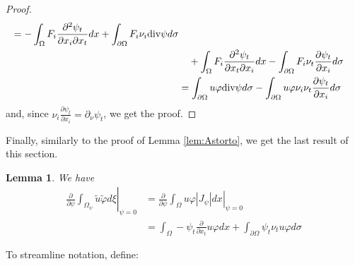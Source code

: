 \documentclass[a4paper,reqno,11pt,oneside]{amsart}
\theoremstyle{plain}
\theoremstyle{plain}
\newtheorem{lemma}[thm]{Lemma}
\theoremstyle{plain}
\theoremstyle{remark}
\newtheorem{remark}[thm]{Remark}
\def\div{\textup{div}}
\begin{document}
\begin{proof}
$$\begin{aligned}
        =
        -\int_\Omega F_i   \frac{\partial^2 \psi_t}{\partial x_i\partial x_t}dx
        +\int_{\partial\Omega} F_i\nu_i \div \psi d\sigma\\ &\quad
        +\int_\Omega  F_i \frac{\partial^2 \psi_t}{ \partial x_t\partial x_i}dx
      -  \int_{\partial \Omega } F_i \nu_t\frac{\partial \psi_t}{\partial x_i}d\sigma\\ &
      =\int_{\partial\Omega} u\varphi \div \psi d\sigma
      -  \int_{\partial \Omega } u\varphi \nu_i \nu_t\frac{\partial \psi_t}{\partial x_i}d\sigma
\end{aligned}$$
and, since $\nu_i \frac{\partial \psi_t}{\partial x_i}=\partial_\nu \psi_t$, we get the proof.

\end{proof} 
Finally, similarly to the proof of Lemma \ref{lem:Astorto}, we get the last result of this section. 
\begin{lemma}\label{lem:uv}
 We have 
$$\begin{aligned}
\left. \frac{\partial}{\partial \psi}\int_{ \Omega_\psi} \tilde u\tilde \varphi d\xi\right|_{\psi=0}&=
\left. \frac{\partial}{\partial \psi}\int_{ \Omega} u\varphi |J_\psi|dx\right|_{\psi=0}
\\ &=\int_\Omega-\psi_t \frac{\partial}{\partial x_t}  u \varphi  dx
+\int_{\partial\Omega}\psi_t \nu_t  u \varphi d\sigma
 \end{aligned}$$
\end{lemma}
To streamline notation, define:  
\end{document}
